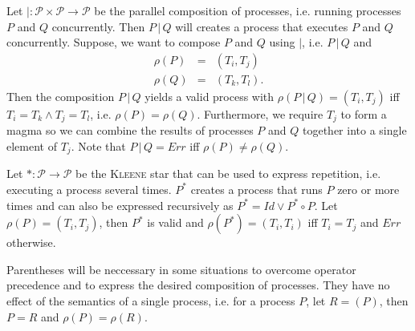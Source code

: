 Let $| \colon \mathcal{P} \times \mathcal{P} \to \mathcal{P}$ be the parallel composition of processes, i.e. running processes $P$ and $Q$ concurrently. Then $P \,|\, Q$ will creates a process that executes $P$ and $Q$ concurrently. Suppose, we want to compose $P$ and $Q$ using $|$, i.e. $P \,|\, Q$ and
\begin{eqnarray*}
  \rho \left( P \right) & = & \left( T_i, T_j \right) \\
  \rho \left( Q \right) & = & \left( T_k, T_l \right).
\end{eqnarray*}
Then the composition $P \,|\, Q$ yields a valid process with $\rho \left( P \,|\, Q \right) = \left( T_i, T_j \right)$ iff $T_i = T_k \wedge T_j = T_l$, i.e. $\rho \left( P \right) = \rho \left( Q \right)$. Furthermore, we require $T_j$ to form a magma so we can combine the results of processes $P$ and $Q$ together into a single element of $T_j$. Note that $P \,|\, Q = Err$ iff $\rho \left( P \right) \neq \rho \left( Q \right)$.


Let $* \colon \mathcal{P} \to \mathcal{P}$ be the \textsc{Kleene} star that can be used to express repetition, i.e. executing a process several times. $P^*$ creates a process that runs $P$ zero or more times and can also be expressed recursively as $P^* = Id \vee P^* \circ P$. Let $\rho \left( P \right) = \left( T_i, T_j \right)$, then $P^*$ is valid and $\rho \left( P^* \right) = \left( T_i, T_i \right)$ iff $T_i = T_j$ and $Err$ otherwise.


Parentheses will be neccessary in some situations to overcome operator precedence and to express the desired composition of processes. They have no effect of the semantics of a single process, i.e. for a process $P$, let $R = \left( P \right)$, then $P = R$ and $\rho \left( P \right) = \rho \left( R \right)$.






